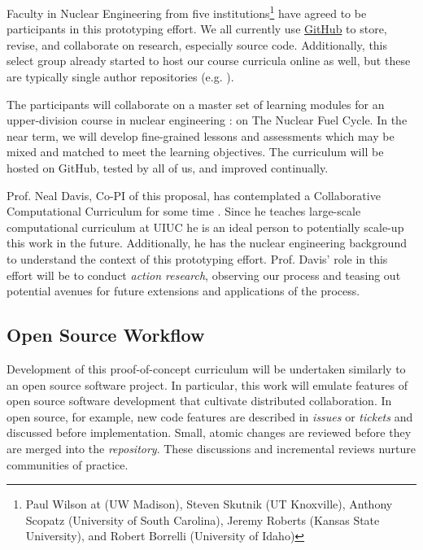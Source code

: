 \documentclass[11pt]{article}
\begin{document}
          Faculty in Nuclear Engineering from five institutions\footnote{
          Paul Wilson at (UW Madison), 
          Steven Skutnik (UT Knoxville), 
          Anthony Scopatz (University of South Carolina), 
          Jeremy Roberts (Kansas State University), 
          and Robert Borrelli (University of Idaho)
          } have agreed to be participants in 
          this prototyping effort. We all currently use 
          \href{https://github.com}{GitHub} to store, 
          revise, and collaborate on research, especially source code. 
          Additionally, this select group already started to host our course 
          curricula online as well, but these are typically single author 
          repositories (e.g. \cite{huff_npre412_2017}).

          The participants will collaborate on a master set of learning 
          modules for an upper-division course in nuclear engineering : 
          on The Nuclear Fuel Cycle. In the near term, we will develop 
          fine-grained lessons and assessments which may be mixed and matched 
          to meet the learning objectives. The curriculum will be hosted on 
          GitHub, tested by all of us, and improved continually.

          Prof. Neal Davis, Co-PI of this proposal, has contemplated a 
          Collaborative Computational Curriculum for some time 
          \cite{davis_ui-ccc_2016}. Since he 
          teaches large-scale 
          computational curriculum at UIUC 
          he is an ideal person to potentially scale-up this work in the 
          future. Additionally, he has the nuclear engineering background to 
          understand the context of this prototyping effort. Prof. Davis' role 
          in this effort will be to conduct \emph{action research}, observing 
          our process and teasing out potential avenues for future 
          extensions and applications of the process. 

          \subsection{Open Source Workflow}
          Development of this proof-of-concept curriculum will be undertaken 
          similarly to an open source software project. 
          In particular, this work will emulate features of open source software development 
          that cultivate distributed collaboration. In open source, for 
          example, new code features are described in \emph{issues} or 
          \emph{tickets} and discussed before implementation. Small, atomic 
          changes are reviewed before they are merged into the 
          \emph{repository}. These discussions and incremental reviews nurture 
          communities of practice.
\end{document}
